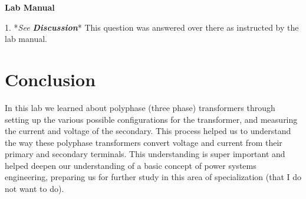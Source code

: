 \documentclass[]{report}
\begin{document}
\textbf{Lab Manual}

1. *\textit{See \textbf{Discussion}}* This question was answered over there as instructed by the lab manual.

\section*{Conclusion}

In this lab we learned about polyphase (three phase) transformers through setting up the various possible configurations for the transformer, and measuring the current and voltage of the secondary. This process helped us to understand the way these polyphase transformers convert voltage and current from their primary and secondary terminals. This understanding is super important and helped deepen our understanding of a basic concept of power systems engineering, preparing us for further study in this area of specialization (that I do not want to do).
\end{document}
